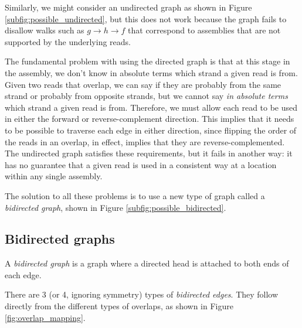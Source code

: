 \documentclass[10pt]{article}
\newcommand{\Figure}[1]{Figure \ref{#1}}
\newcommand{\Subfigure}[1]{Figure \ref{#1}}
\newcommand{\KeyTerm}[1]{{\it #1}}
\begin{document}
Similarly, we might consider an undirected graph as shown in
\Subfigure{subfig:possible_undirected}, but this does not work because
the graph fails to disallow walks such as $g \to h \to f$ that correspond to
assemblies that are not supported by the underlying reads.

The fundamental problem with using the directed graph is that at this stage in
the assembly, we don't know in absolute terms which strand a given read is from.
Given two reads that overlap, we can say if they are probably from the same
strand or probably from opposite strands, but we cannot say {\em in absolute
terms} which strand a given read is from.  Therefore, we must allow each read to
be used in either the forward or reverse-complement direction.  This implies
that it needs to be possible to traverse each edge in either direction, since
flipping the order of the reads in an overlap, in effect, implies that they are
reverse-complemented.  The undirected graph satisfies these requirements, but it
fails in another way: it has no guarantee that a given read is used in a
consistent way at a location within any single assembly.

The solution to all these problems is to use a new type of graph called a
\KeyTerm{bidirected graph}, shown in \Subfigure{subfig:possible_bidirected}.

\subsection{Bidirected graphs}

A \KeyTerm{bidirected graph} is a graph where a directed head is attached to both
ends of each edge.

There are 3 (or 4, ignoring symmetry) types of \KeyTerm{bidirected edges}.  They
follow directly from the different types of overlaps, as shown in
\Figure{fig:overlap_mapping}.
\end{document}
